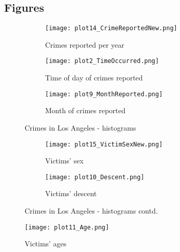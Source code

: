 \documentclass{article}
\begin{document}
\subsection*{Figures}


\begin{figure}
\centering
\begin{subfigure}[b]{0.45\textwidth}
\texttt{[image: plot14\_CrimeReportedNew.png]}
\caption{Crimes reported per year}
\label{fig:crpy}
\end{subfigure}
\begin{subfigure}[b]{0.45\textwidth}
\texttt{[image: plot2\_TimeOccurred.png]}
\caption{Time of day of crimes reported}
\label{fig:crtod}
\end{subfigure}
    
\begin{subfigure}[b]{0.45\textwidth}
\texttt{[image: plot9\_MonthReported.png]}
\caption{Month of crimes reported}
\label{fig:crmo}
\end{subfigure}
\caption{Crimes in Los Angeles - histograms}\label{fig:clah}
\end{figure}

\begin{figure}
\centering
\begin{subfigure}[b]{0.45\textwidth}
\texttt{[image: plot15\_VictimSexNew.png]}
\caption{Victims' sex}
\label{fig:vi_se}
\end{subfigure}
\begin{subfigure}[b]{0.45\textwidth}
\texttt{[image: plot10\_Descent.png]}
\caption{Victims' descent}
\label{fig:vi_de}
\end{subfigure}
\caption{Crimes in Los Angeles - histograms contd.}\label{fig:clah2}
\end{figure}

\begin{figure}
\centering
\texttt{[image: plot11\_Age.png]}
\caption{Victims' ages}
\label{fig:age}
\end{figure}
\end{document}
